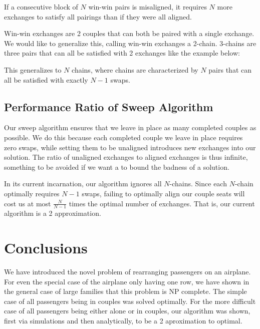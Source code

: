 \begin{cor} \label{cor:winWinAsBlocks}
If a consecutive block of $N$ win-win pairs is misaligned, it requires $N$ more exchanges to satisfy all pairings than if they were all aligned.
\end{cor}

Win-win exchanges are 2 couples that can both be paired with a single exchange.  We would like to generalize this, calling win-win exchanges a 2-chain.  3-chains are three pairs that can all be satisfied with 2 exchanges like the example below:

\begin{figure}[H]
\centering
{}
\end{figure}

This generalizes to $N$ chains, where chains are characterized by $N$ pairs that can all be satisfied with exactly $N-1$ swaps.

\subsection{Performance Ratio of Sweep Algorithm}

Our sweep algorithm ensures that we leave in place as many completed couples as possible. We do this because each completed couple we leave in place requires zero swaps, while setting them to be unaligned introduces new exchanges into our solution.  The ratio of unaligned exchanges to aligned exchanges is thus infinite, something to be avoided if we want a to bound the badness of a solution.

In its current incarnation, our algorithm ignores all $N$-chains.  Since each $N$-chain optimally requires $N-1$ swaps, failing to optimally align our couple seats will cost us at most $\frac{N}{N-1}$ times the optimal number of exchanges.  That is, our current algorithm is a 2 approximation.

\section{Conclusions}

We have introduced the novel problem of rearranging passengers on an airplane.  For even the special case of the airplane only having one row, we have shown in the general case of large families that this problem is NP complete.  The simple case of all passengers being in couples was solved optimally. For the more difficult case of all passengers being either alone or in couples, our algorithm was shown, first via simulations and then analytically, to be a 2 aproximation to optimal.

